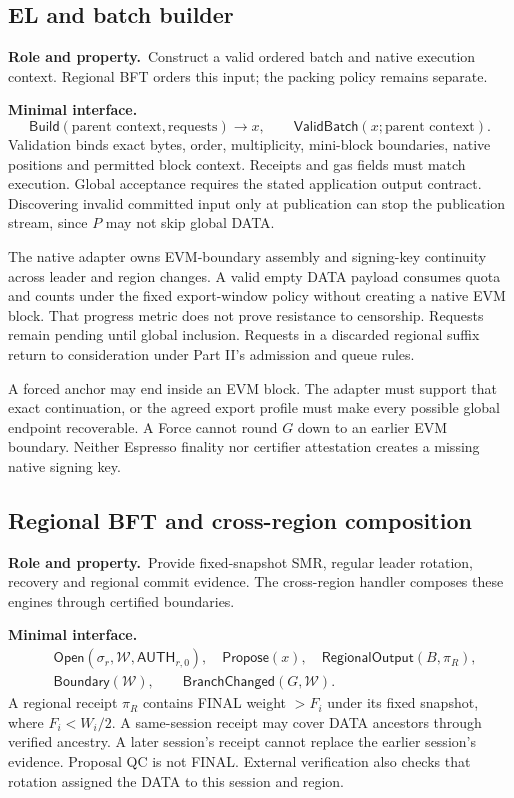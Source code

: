\documentclass[11pt,a4paper]{article}
\newcommand{\api}[1]{\ensuremath{\mathsf{#1}}}
\newcommand{\role}{\textbf{Role and property.}\ }
\newcommand{\iface}{\textbf{Minimal interface.}\ }
\begin{document}
\subsection{EL and batch builder}
\role Construct a valid ordered batch and native execution context.
Regional BFT orders this input; the packing policy remains separate.

\iface
\[
 \api{Build}(\text{parent context},\text{requests})\to x,\qquad
 \api{ValidBatch}(x;\text{parent context}).
\]
Validation binds exact bytes, order, multiplicity, mini-block boundaries,
native positions and permitted block context. Receipts and gas fields
must match execution. Global acceptance requires the stated application
output contract. Discovering invalid committed input only at publication
can stop the publication stream, since $P$ may not skip global DATA.

The native adapter owns EVM-boundary assembly and signing-key continuity
across leader and region changes. A valid empty DATA payload consumes
quota and counts under the fixed export-window policy without creating
a native EVM block. That progress metric does not prove resistance to
censorship. Requests remain pending until global inclusion. Requests in
a discarded regional suffix return to consideration under Part II's
admission and queue rules.

A forced anchor may end inside an EVM block. The adapter must support
that exact continuation, or the agreed export profile must make every
possible global endpoint recoverable. A Force cannot round $G$ down to
an earlier EVM boundary. Neither Espresso finality nor certifier
attestation creates a missing native signing key.

\subsection{Regional BFT and cross-region composition}
\role Provide fixed-snapshot SMR, regular leader rotation, recovery and
regional commit evidence. The cross-region handler composes these
engines through certified boundaries.

\iface
\[
\begin{aligned}
 &\api{Open}(\sigma_r,\mathcal W,\api{AUTH}_{r,0}),\quad
   \api{Propose}(x),\quad \api{RegionalOutput}(B,\pi_R),\\
 &\api{Boundary}(\mathcal W),\qquad
   \api{BranchChanged}(G,\mathcal W).
\end{aligned}
\]
A regional receipt $\pi_R$ contains FINAL weight $>F_i$ under its fixed
snapshot, where $F_i<W_i/2$. A same-session receipt may cover DATA
ancestors through verified ancestry. A later session's receipt cannot
replace the earlier session's evidence. Proposal QC is not FINAL.
External verification also checks that rotation assigned the DATA to
this session and region.
\end{document}
